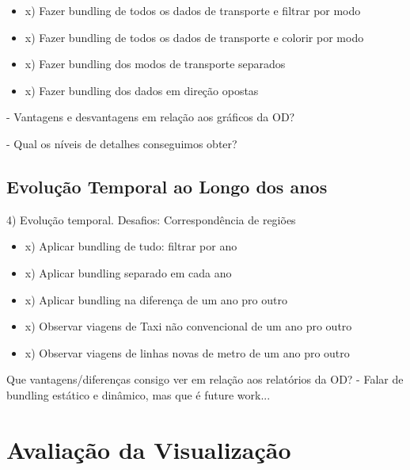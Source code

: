  \begin{itemize}
    \item x) Fazer bundling de todos os dados de transporte e filtrar por modo
    \item x) Fazer bundling de todos os dados de transporte e colorir por modo
    \item x) Fazer bundling dos modos de transporte separados
    \item x) Fazer bundling dos dados em direção opostas
  \end{itemize}

	- Vantagens e desvantagens em relação aos gráficos da OD?

	- Qual os níveis de detalhes conseguimos obter?


\subsection{Evolução Temporal ao Longo dos anos}

4) Evolução temporal. Desafios: Correspondência de regiões

  \begin{itemize}
    \item x) Aplicar bundling de tudo: filtrar por ano
    \item x) Aplicar bundling separado em cada ano
    \item x) Aplicar bundling na diferença de um ano pro outro
    \item x) Observar viagens de Taxi não convencional de um ano pro outro
    \item x) Observar viagens de linhas novas de metro de um ano pro outro
  \end{itemize}

	Que vantagens/diferenças consigo ver em relação aos relatórios da OD?
	- Falar de bundling estático e dinâmico, mas que é future work...


\section{Avaliação da Visualização} 
